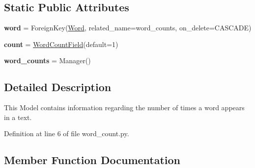 \subsection*{Static Public Attributes}
\begin{DoxyCompactItemize}
\item 
\mbox{\label{classcapstoneproject_1_1models_1_1models_1_1word__count_1_1_word_count_a1d94f8ad3f136346d809979987554f31}} 
{\bfseries word} = Foreign\+Key(\textquotesingle{}\mbox{\hyperlink{classcapstoneproject_1_1models_1_1models_1_1word_1_1_word}{Word}}\textquotesingle{}, related\+\_\+name=\textquotesingle{}word\+\_\+counts\textquotesingle{}, on\+\_\+delete=C\+A\+S\+C\+A\+DE)
\item 
\mbox{\label{classcapstoneproject_1_1models_1_1models_1_1word__count_1_1_word_count_a1f59187e689769e9541f71678c2bd563}} 
{\bfseries count} = \mbox{\hyperlink{classcapstoneproject_1_1models_1_1fields_1_1word__count__field_1_1_word_count_field}{Word\+Count\+Field}}(default=1)
\item 
\mbox{\label{classcapstoneproject_1_1models_1_1models_1_1word__count_1_1_word_count_a280b8a20f5e928c0a55605652be647d0}} 
{\bfseries word\+\_\+counts} = Manager()
\end{DoxyCompactItemize}


\subsection{Detailed Description}
\begin{DoxyVerb}This Model contains information regarding the number of times
a word appears in a text.
\end{DoxyVerb}
 

Definition at line 6 of file word\+\_\+count.\+py.



\subsection{Member Function Documentation}
\mbox{\label{classcapstoneproject_1_1models_1_1models_1_1word__count_1_1_word_count_a3fee9d9f7d420f70b1b2d2e9fef5d0a7}} 
